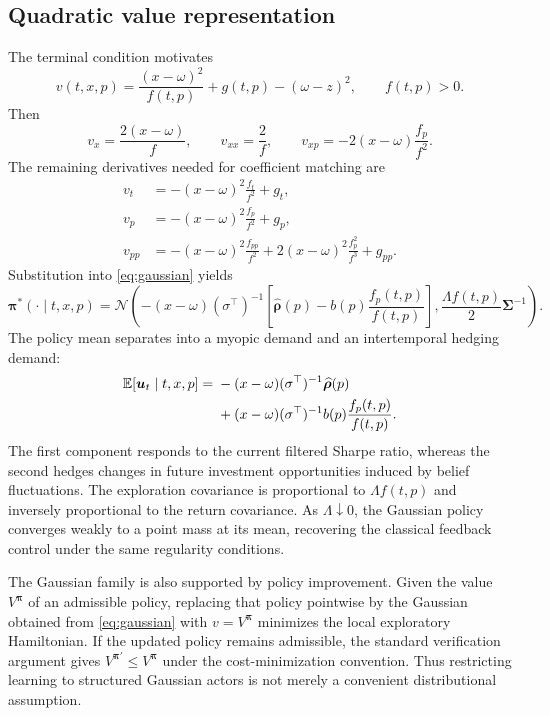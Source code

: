 \documentclass[a4paper,10pt]{article}
\newcommand{\E}{\mathbb{E}}
\newcommand{\N}{\mathcal{N}}
\newcommand{\bpi}{\bm{\pi}}
\newcommand{\bu}{\bm{u}}
\newcommand{\bSigma}{\bm{\Sigma}}
\newcommand{\brho}{\bm{\rho}}
\begin{document}
\subsection{Quadratic value representation}

The terminal condition motivates
\begin{equation}
v(t,x,p)=\frac{(x-\omega)^2}{f(t,p)}+g(t,p)-(\omega-z)^2,
\qquad f(t,p)>0.
\label{eq:ansatz}
\end{equation}
Then
\begin{equation}
v_x=\frac{2(x-\omega)}{f},\qquad
v_{xx}=\frac{2}{f},\qquad
v_{xp}=-2(x-\omega)\frac{f_p}{f^2}.
\end{equation}
The remaining derivatives needed for coefficient matching are
\begin{align}
v_t&=-(x-\omega)^2\frac{f_t}{f^2}+g_t,\\
v_p&=-(x-\omega)^2\frac{f_p}{f^2}+g_p,\\
v_{pp}&=-(x-\omega)^2\frac{f_{pp}}{f^2}
+2(x-\omega)^2\frac{f_p^2}{f^3}+g_{pp}.
\label{eq:ansatz_derivatives}
\end{align}
Substitution into \eqref{eq:gaussian} yields
\begin{equation}
\bpi^*(\cdot\mid t,x,p)
=\N\left(
-(x-\omega)(\sigma^\top)^{-1}
\left[\widehat{\brho}(p)-b(p)\frac{f_p(t,p)}{f(t,p)}\right],
\frac{\Lambda f(t,p)}{2}\bSigma^{-1}
\right).
\label{eq:structured_actor}
\end{equation}
The policy mean separates into a myopic demand and an intertemporal hedging demand:
\begin{align}
\E[\bu_t\mid t,x,p]
={}&-(x-\omega)(\sigma^\top)^{-1}\widehat{\brho}(p) \notag\\
&+(x-\omega)(\sigma^\top)^{-1}b(p)\frac{f_p(t,p)}{f(t,p)}.
\label{eq:myopic_hedging}
\end{align}
The first component responds to the current filtered Sharpe ratio, whereas the second hedges changes in future investment opportunities induced by belief fluctuations. The exploration covariance is proportional to $\Lambda f(t,p)$ and inversely proportional to the return covariance. As $\Lambda\downarrow0$, the Gaussian policy converges weakly to a point mass at its mean, recovering the classical feedback control under the same regularity conditions.

The Gaussian family is also supported by policy improvement. Given the value $V^{\bpi}$ of an admissible policy, replacing that policy pointwise by the Gaussian obtained from \eqref{eq:gaussian} with $v=V^{\bpi}$ minimizes the local exploratory Hamiltonian. If the updated policy remains admissible, the standard verification argument gives $V^{\bpi'}\le V^{\bpi}$ under the cost-minimization convention. Thus restricting learning to structured Gaussian actors is not merely a convenient distributional assumption.
\end{document}
